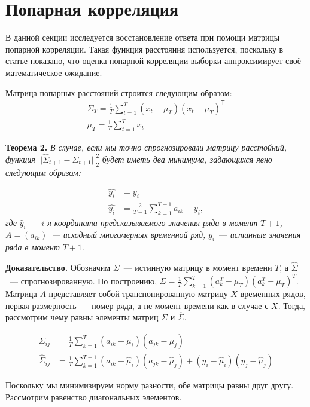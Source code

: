 \documentclass{article}
\begin{document}
\section{Попарная корреляция}

В данной секции исследуется восстановление ответа при помощи матрицы попарной корреляции. Такая функция расстояния используется, поскольку в статье \cite{puchkin2023sharper} показано, что оценка попарной корреляции выборки аппроксимирует своё математическое ожидание.

Матрица попарных расстояний строится следующим образом:
\begin{gather*}
	{\Sigma}_T = \frac{1}{T} \sum_{t=1}^{T} (x_t - \mu_T)(x_t - \mu_T)^\mathsf{T}\\
	\mu_T = \frac{1}{T} \sum_{t=1}^{T} x_t
\end{gather*}

\textbf{Теорема 2.} \textit{В случае, если мы точно спрогнозировали матрицу расстойний, функция} $||\hat{\Sigma}_{t+1} - \bar{\Sigma}_{t+1}||_2^2$ \textit{будет иметь два минимума, задающихся явно следующим образом:}

\begin{align*}
	\hat{y_i} &= y_i\\
	\hat{y_i} &= \frac{2}{T-1} \sum_{k=1}^{T-1} a_{ik} - y_i,
\end{align*}
\textit{где} $\hat{y}_i$~--- $i$\textit{-я координата предсказываемого значения ряда в момент $T+1$, $A=(a_{ik})$~--- исходный многомерных временной ряд,} $y_i$~--- \textit{истинные значения ряда в момент} $T+1$.

\textbf{Доказательство.} Обозначим $\Sigma$~--- истинную матрицу в момент времени $T$, а $\hat{\Sigma}$~--- спрогнозированную. По построению, ${\Sigma} = \frac{1}{T} \sum_{k=1}^{T} (a^T_k - \mu_T)(a^T_k - \mu_T)^T$. Матрица $A$ представляет собой транспонированную матрицу $X$ временных рядов, первая размерность~--- номер ряда, а не момент времени как в случае с $X$. Тогда, рассмотрим чему равны элементы матриц $\Sigma$ и $\hat{\Sigma}$.

\begin{align*}
	\Sigma_{ij} &= \frac{1}{T}\sum_{k=1}^{T}(a_{ik} - \mu_i)(a_{jk}-\mu_j)\\
	\hat{\Sigma}_{ij} &= \frac{1}{T}\sum_{k=1}^{T-1}(a_{ik} - \hat{\mu}_i)(a_{jk}-\hat{\mu}_j) + (y_i - \hat{\mu}_i)(y_j - \hat{\mu}_j)
\end{align*}

Поскольку мы минимизируем норму разности, обе матрицы равны друг другу. Рассмотрим равенство диагональных элементов.
\end{document}
